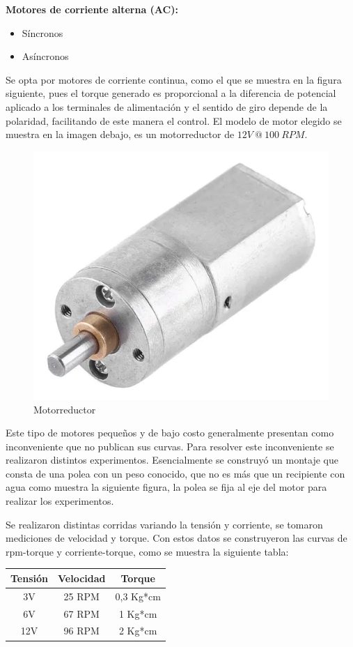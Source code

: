 \textbf{Motores de corriente alterna (AC):}
\begin{itemize}
   \item Síncronos
   \item Asíncronos
\end{itemize}

Se opta por motores de corriente continua, como el que se muestra en la figura siguiente, pues el torque generado es proporcional a la diferencia de potencial aplicado a los terminales de alimentación y el sentido de giro depende de la polaridad, facilitando de este manera el control. El modelo de motor elegido se muestra en la imagen debajo, es un motorreductor de $12V\ @\ 100\ RPM$.

\begin{figure}[H]
    \centering
    \includegraphics[width=0.35\linewidth]{images/motorreductor.png}
    \caption{Motorreductor}
\end{figure}


Este tipo de motores pequeños y de bajo costo generalmente presentan como inconveniente que no publican sus curvas. Para resolver este inconveniente se realizaron distintos experimentos. Esencialmente se construyó un montaje que consta de una polea con un peso conocido, que no es más que un recipiente con agua como muestra la siguiente figura, la polea se fija al eje del motor para realizar los experimentos.

Se realizaron distintas corridas variando la tensión y corriente, se tomaron mediciones de velocidad y torque. Con estos datos se construyeron las curvas de rpm-torque y corriente-torque, como se muestra la siguiente tabla:

\begin{center} \begin{tabular}{|c|c|c|}
   \hline \rowcolor{test_header_color}
       Tensión & Velocidad & Torque \\
   \hline
       3V & 25 RPM & 0,3 Kg*cm\\
   \hline
       6V & 67 RPM & 1 Kg*cm\\
   \hline
       12V & 96 RPM & 2 Kg*cm\\
   \hline
\end{tabular} \end{center}

